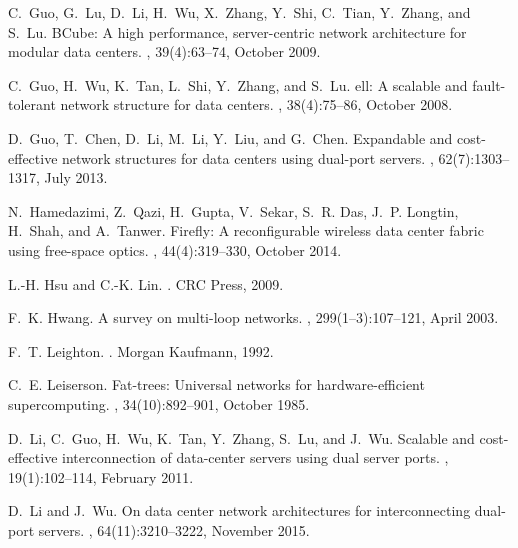 \documentclass[]{amsart}
\begin{document}
\begin{thebibliography}{10}
C.~Guo, G.~Lu, D.~Li, H.~Wu, X.~Zhang, Y.~Shi, C.~Tian, Y.~Zhang, and S.~Lu.
\newblock B{C}ube: A high performance, server-centric network architecture for
  modular data centers.
, 39(4):63--74, October
  2009.

C.~Guo, H.~Wu, K.~Tan, L.~Shi, Y.~Zhang, and S.~Lu.
ell: A scalable and fault-tolerant network structure for data
  centers.
, 38(4):75--86, October
  2008.

D.~Guo, T.~Chen, D.~Li, M.~Li, Y.~Liu, and G.~Chen.
\newblock Expandable and cost-effective network structures for data centers
  using dual-port servers.
, 62(7):1303--1317, July 2013.

N.~Hamedazimi, Z.~Qazi, H.~Gupta, V.~Sekar, S.~R. Das, J.~P. Longtin, H.~Shah,
  and A.~Tanwer.
\newblock Firefly: A reconfigurable wireless data center fabric using
  free-space optics.
, 44(4):319--330, October
  2014.

L.-H. Hsu and C.-K. Lin.
.
\newblock CRC Press, 2009.

F.~K. Hwang.
\newblock A survey on multi-loop networks.
, 299(1--3):107--121, April 2003.

F.~T. Leighton.
.
\newblock Morgan Kaufmann, 1992.

C.~E. Leiserson.
\newblock Fat-trees: Universal networks for hardware-efficient supercomputing.
, 34(10):892--901, October 1985.

D.~Li, C.~Guo, H.~Wu, K.~Tan, Y.~Zhang, S.~Lu, and J.~Wu.
\newblock Scalable and cost-effective interconnection of data-center servers
  using dual server ports.
, 19(1):102--114, February
  2011.

D.~Li and J.~Wu.
\newblock On data center network architectures for interconnecting dual-port
  servers.
, 64(11):3210--3222, November
  2015.


\end{thebibliography}
\end{document}
